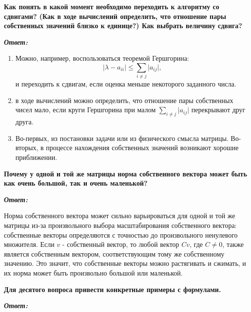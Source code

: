 \documentclass[12pt, a4paper]{article}
\newcommand{\abs}[1]{\lvert #1 \rvert}
\begin{document}
\item \textbf{Как понять в какой момент необходимо переходить к алгоритму со сдвигами? (Как в ходе вычислений определить, что отношение пары собственных значений близко к единице?) Как выбрать величину сдвига?}
\vspace*{0.2cm}

\textit{\textbf{Ответ:}}

\begin{enumerate}
	\item Можно, например, воспользоваться теоремой Гершгорина:  
	\[
	\abs{\lambda - a_{ii}} \le \sum\limits_{i \neq j}\abs{a_{ij}},
	\] 
	и переходить к сдвигам, если оценка меньше некоторого заданного числа.
	\item в ходе вычислений можно определить, что отношение пары собственных чисел мало, если круги Гершгорина при малом $\sum\limits_{i \neq j}\abs{a_{ij}}$ перекрывают друг друга.
	\item Во-первых, из постановки задачи или из физического смысла матрицы. Во-вторых, в процессе нахождения собственных значений возникают хорошие приближении.
\end{enumerate}

\item \textbf{Почему у одной и той же матрицы норма собственного вектора может быть как очень большой, так и очень маленькой?}

\vspace*{0.2cm}

\textit{\textbf{Ответ:}}

Норма собственного вектора может сильно варьироваться для одной и той же матрицы из-за произвольного выбора масштабирования собственного вектора: собственные векторы определяются с точностью до произвольного ненулевого множителя. Если $v$ - собственный вектор, то любой вектор $Cv$, где $C \neq 0$, также является собственным вектором, соответствующим тому же собственному значению. Это значит, что собственные векторы можно растягивать и сжимать, и их норма может быть произвольно большой или маленькой.

\item \textbf{Для десятого вопроса привести конкретные примеры с формулами.}
\vspace*{0.2cm}

\textit{\textbf{Ответ:}}
\end{document}
